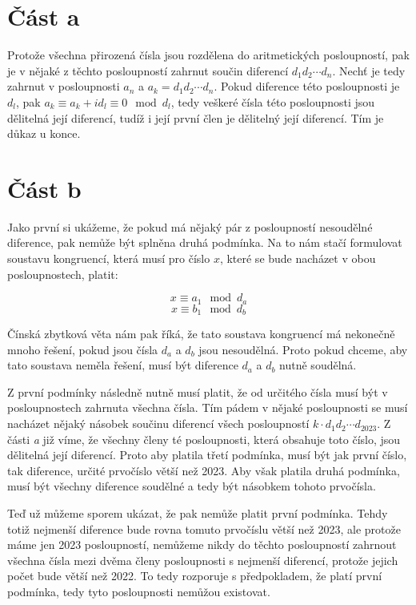 \documentclass{fkssolpub}
\author{Ondřej Sedláček}
\begin{document}
\section{Část a}

Protože všechna přirozená čísla jsou rozdělena do aritmetických posloupností,
pak je v nějaké z těchto posloupností zahrnut součin diferencí $d_1 d_2 \cdots
	d_n$. Nechť je tedy zahrnut v posloupnosti $a_n$ a $a_k = d_1 d_2 \cdots d_n$.
Pokud diference této posloupnosti je $d_l$, pak
$a_k \equiv a_k + i d_l \equiv 0 \mod{d_l}$, tedy veškeré čísla této posloupnosti
jsou dělitelná její diferencí, tudíž i její první člen je dělitelný její diferencí.
Tím je důkaz u konce.

\section{Část b}

Jako první si ukážeme, že pokud má nějaký pár z posloupností nesoudělné diference,
pak nemůže být splněna druhá podmínka. Na to nám stačí formulovat soustavu kongruencí,
která musí pro číslo $x$, které se bude nacházet v obou posloupnostech, platit:

\[
	x \equiv a_1 \mod{d_a}
\]
\[
	x \equiv b_1 \mod{d_b}
\]

Čínská zbytková věta nám pak říká, že tato soustava kongruencí má nekonečně mnoho
řešení, pokud jsou čísla $d_a$ a $d_b$ jsou nesoudělná. Proto pokud chceme, aby
tato soustava neměla řešení, musí být diference $d_a$ a $d_b$ nutně soudělná.

Z první podmínky následně nutně musí platit, že od určitého čísla musí být v posloupnostech
zahrnuta všechna čísla. Tím pádem v nějaké posloupnosti se musí nacházet nějaký
násobek součinu diferencí všech posloupností $k \cdot d_1 d_2 \cdots d_{2023}$.
Z části \textit{a} již víme, že všechny členy té posloupnosti, která obsahuje toto číslo,
jsou dělitelná její diferencí. Proto aby platila třetí podmínka, musí být jak první
číslo, tak diference, určité prvočíslo větší než 2023. Aby však platila druhá
podmínka, musí být všechny diference soudělné a tedy být násobkem tohoto prvočísla.

Teď už můžeme sporem ukázat, že pak nemůže platit první podmínka. Tehdy totiž
nejmenší diference bude rovna tomuto prvočíslu větší než 2023, ale protože máme
jen 2023 posloupností, nemůžeme nikdy do těchto posloupností zahrnout
všechna čísla mezi dvěma členy posloupnosti s nejmenší diferencí, protože jejich
počet bude větší než 2022. To tedy rozporuje s předpokladem, že platí první
podmínka, tedy tyto posloupnosti nemůžou existovat.
\end{document}

